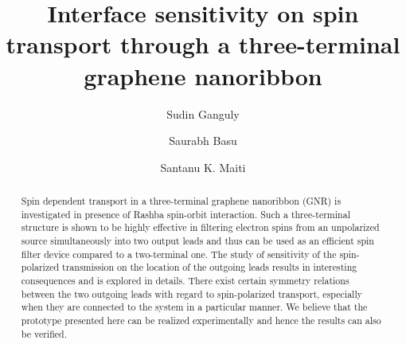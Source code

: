 \documentclass[prb,aps,twocolumn,amsmath,amssymb,floatfix,
superscriptaddress]{revtex4}
\begin{document}
\title{Interface sensitivity on spin transport through a
  three-terminal graphene nanoribbon}

\author{Sudin Ganguly}

\author{Saurabh Basu}



\author{Santanu K. Maiti}





\begin{abstract}
Spin dependent transport in a three-terminal graphene nanoribbon (GNR)
is investigated in presence of Rashba spin-orbit interaction. Such a
three-terminal structure is shown to be highly effective in filtering
electron spins from an unpolarized source simultaneously into two
output leads and thus can be used as an efficient spin filter device
compared to a two-terminal one. The study of sensitivity of the
spin-polarized transmission on the location of the outgoing leads
results in interesting consequences and is explored in details. There
exist certain symmetry relations between the two outgoing leads with
regard to spin-polarized transport, especially when they are connected
to the system in a particular manner. We believe that the prototype
presented here can be realized experimentally and hence the results
can also be verified.
\end{abstract}



\maketitle
\end{document}
